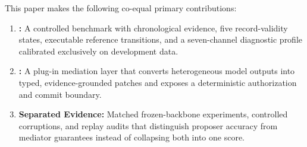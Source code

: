 This paper makes the following co-equal primary contributions:
\begin{enumerate}[leftmargin=*]
\item \textbf{\bench{}:} A controlled benchmark with chronological evidence, five record-validity states, executable reference transitions, and a seven-channel diagnostic profile calibrated exclusively on development data.
\item \textbf{\method{}:} A plug-in mediation layer that converts heterogeneous model outputs into typed, evidence-grounded patches and exposes a deterministic authorization and commit boundary.
\item \textbf{Separated Evidence:} Matched frozen-backbone experiments, controlled corruptions, and replay audits that distinguish proposer accuracy from mediator guarantees instead of collapsing both into one score.
\end{enumerate}
